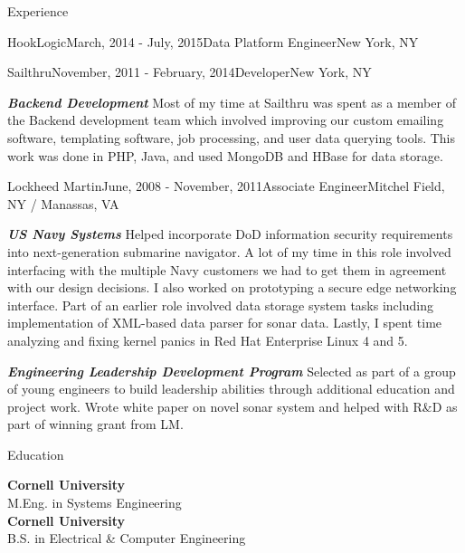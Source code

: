 \documentclass{resume} %
\begin{document}
\begin{rSection}{Experience}
\begin{rSubsection}{HookLogic}{March, 2014 - July, 2015}{Data Platform Engineer}{New York, NY}
  \end{rSubsection}

  \begin{rSubsection}{Sailthru}{November, 2011 - February, 2014}{Developer}{New York, NY}
  \item \textbf{\textit{Backend Development}} Most of my time at Sailthru was spent as a member of the Backend development team which involved improving our custom emailing software, templating software, job processing, and user data querying tools. This work was done in PHP, Java, and used MongoDB and HBase for data storage.
  \end{rSubsection}


  \begin{rSubsection}{Lockheed Martin}{June, 2008 - November, 2011}{Associate Engineer}{Mitchel Field, NY / Manassas, VA}
  \item \textbf{\textit{US Navy Systems}} Helped incorporate DoD information security requirements into next-generation submarine navigator. A lot of my time in this role involved interfacing with the multiple Navy customers we had to get them in agreement with our design decisions. I also worked on prototyping a secure edge networking interface. Part of an earlier role involved data storage system tasks including implementation of XML-based data parser for sonar data. Lastly, I spent time analyzing and fixing kernel panics in Red Hat Enterprise Linux 4 and 5.
  \item \textbf{\textit{Engineering Leadership Development Program}} Selected
    as part of a group of young engineers to build leadership abilities through
    additional education and project work. Wrote white paper on novel sonar
    system and helped with R\&D as part of winning grant from LM.
  \end{rSubsection}

\end{rSection}


\begin{rSection}{Education}

  {\bf Cornell University} \\ 
  M.Eng. in Systems Engineering \\

  {\bf Cornell University} \\ 
  B.S. in Electrical \& Computer Engineering \\
\end{rSection}
\end{document}
